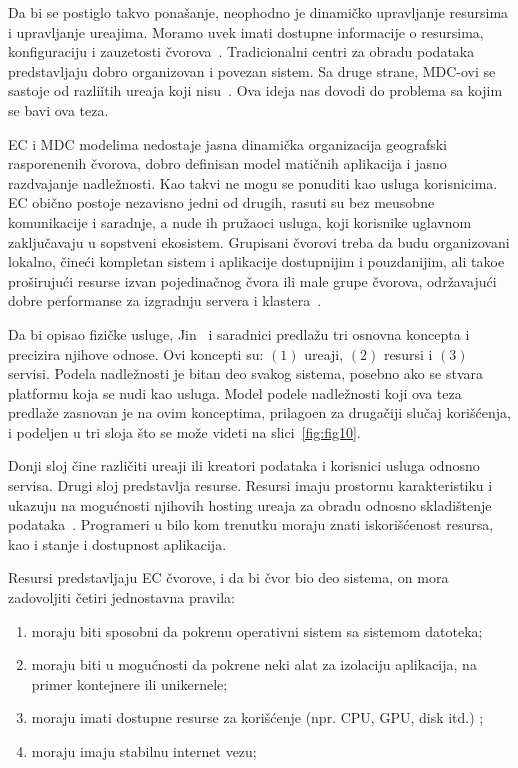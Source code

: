 Da bi se postiglo takvo pona\v sanje, neophodno je dinami\v cko upravljanje resursima i upravljanje ure\dj ajima. Moramo uvek imati dostupne informacije o resursima, konfiguraciju i zauzetosti \v cvorova~\cite{GubbiBMP13, WangZZWYW17}. Tradicionalni centri za obradu podataka predstavljaju dobro organizovan i povezan sistem. Sa druge strane, MDC-ovi se sastoje od razli\v itih ure\dj aja koji nisu~\cite{JiangCGZW19}. Ova ideja nas dovodi do problema sa kojim se bavi ova teza.

EC i MDC modelima nedostaje jasna dinami\v cka organizacija geografski raspore\dj nenih \v cvorova, dobro definisan model mati\v cnih aplikacija i jasno razdvajanje nadle\v znosti. Kao takvi ne mogu se ponuditi kao usluga korisnicima. EC obi\v cno postoje nezavisno jedni od drugih, rasuti su bez me\dj usobne komunikacije i saradnje, a nude ih pru\v zaoci usluga, koji korisnike uglavnom zaklju\v cavaju u sopstveni ekosistem. Grupisani \v cvorovi treba da budu organizovani lokalno, \v cine\'ci kompletan sistem i aplikacije dostupnijim i pouzdanijim, ali tako\dj e pro\v siruju\'ci resurse izvan pojedina\v cnog \v cvora ili male grupe \v cvorova, odr\v zavaju\'ci dobre performanse za izgradnju servera i klastera~\cite{ArocaG12}.

Da bi opisao fizi\v cke usluge, Jin~\cite {JinCJL14} i saradnici predla\v zu tri osnovna koncepta i precizira njihove odnose. Ovi koncepti su: $(1)$ ure\dj aji, $(2)$ resursi i $(3)$ servisi. Podela nadle\v znosti je bitan deo svakog sistema, posebno ako se stvara platformu koja se nudi kao usluga. Model podele nadle\v znosti koji ova teza predla\v ze zasnovan je na ovim konceptima, prilago\dj en za druga\v ciji slu\v caj kori\v s\'cenja, i podeljen u tri sloja \v sto se mo\v ze videti na slici~\ref {fig:fig10}. 

Donji sloj \v cine razli\v citi ure\dj aji ili kreatori podataka i korisnici usluga odnosno servisa. Drugi sloj predstavlja resurse. Resursi imaju prostornu karakteristiku i ukazuju na mogu\'cnosti njihovih hosting ure\dj aja za obradu odnosno skladi\v stenje podataka~\cite{JinCJL14}. Programeri u bilo kom trenutku moraju znati iskori\v s\'cenost resursa, kao i stanje i dostupnost aplikacija. 

Resursi predstavljaju EC \v cvorove, i da bi \v cvor bio deo sistema, on mora zadovoljiti \v cetiri jednostavna pravila: 

\begin{enumerate}[start=1,label={(\bfseries \arabic*)}]
\item moraju biti sposobni da pokrenu operativni sistem sa sistemom datoteka;
\item moraju biti u mogu\'cnosti da pokrene neki alat za izolaciju aplikacija, na primer kontejnere ili unikernele; 
\item moraju imati dostupne resurse za kori\v s\'cenje (npr. CPU, GPU, disk itd.) ;
\item moraju imaju stabilnu internet vezu;
\end{enumerate}

